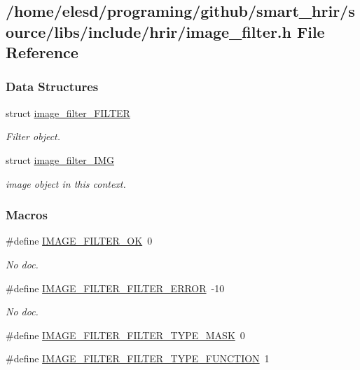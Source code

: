 \hypertarget{a00012}{\subsection{/home/elesd/programing/github/smart\-\_\-hrir/source/libs/include/hrir/image\-\_\-filter.h File Reference}
\label{a00012}
}
\subsubsection*{Data Structures}
\begin{DoxyCompactItemize}
\item 
struct \hyperlink{a00003}{image\-\_\-filter\-\_\-\-F\-I\-L\-T\-E\-R}
\begin{DoxyCompactList}\small\item\em Filter object. \end{DoxyCompactList}\item 
struct \hyperlink{a00004}{image\-\_\-filter\-\_\-\-I\-M\-G}
\begin{DoxyCompactList}\small\item\em image object in this context. \end{DoxyCompactList}\end{DoxyCompactItemize}
\subsubsection*{Macros}
\begin{DoxyCompactItemize}
\item 
\hypertarget{a00012_afee468629fc317d9e41e8f704f253254}{\#define \hyperlink{a00012_afee468629fc317d9e41e8f704f253254}{I\-M\-A\-G\-E\-\_\-\-F\-I\-L\-T\-E\-R\-\_\-\-O\-K}~0}\label{a00012_afee468629fc317d9e41e8f704f253254}

\begin{DoxyCompactList}\small\item\em No doc. \end{DoxyCompactList}\item 
\hypertarget{a00012_aa2ca8faffb84d4737b429c7691d7ae01}{\#define \hyperlink{a00012_aa2ca8faffb84d4737b429c7691d7ae01}{I\-M\-A\-G\-E\-\_\-\-F\-I\-L\-T\-E\-R\-\_\-\-F\-I\-L\-T\-E\-R\-\_\-\-E\-R\-R\-O\-R}~-\/10}\label{a00012_aa2ca8faffb84d4737b429c7691d7ae01}

\begin{DoxyCompactList}\small\item\em No doc. \end{DoxyCompactList}\item 
\#define \hyperlink{a00012_ae0772f91659a981517bc290e7ecd1b7e}{I\-M\-A\-G\-E\-\_\-\-F\-I\-L\-T\-E\-R\-\_\-\-F\-I\-L\-T\-E\-R\-\_\-\-T\-Y\-P\-E\-\_\-\-M\-A\-S\-K}~0
\item 
\#define \hyperlink{a00012_a03498a10622965acd722a6121c64b793}{I\-M\-A\-G\-E\-\_\-\-F\-I\-L\-T\-E\-R\-\_\-\-F\-I\-L\-T\-E\-R\-\_\-\-T\-Y\-P\-E\-\_\-\-F\-U\-N\-C\-T\-I\-O\-N}~1
\end{DoxyCompactItemize}
